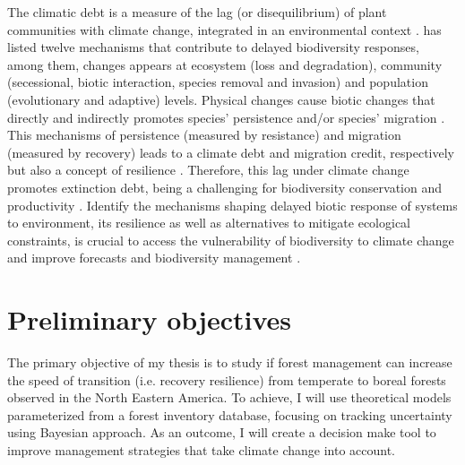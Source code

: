 The climatic debt is a measure of the lag (or disequilibrium) of plant communities with climate change, integrated in an environmental context \parencite{Bertrand2016}.
\textcite{Essl2015} has listed twelve mechanisms that contribute to delayed biodiversity responses, among them, changes appears at ecosystem (loss and degradation), community (secessional, biotic interaction, species removal and invasion) and population (evolutionary and adaptive) levels.
Physical changes cause biotic changes that directly and indirectly promotes species' persistence and/or species' migration \parencite{Bertrand2016}.
This mechanisms of persistence (measured by resistance) and migration (measured by recovery) leads to a climate debt and migration credit, respectively \parencite{Bertrand2016} but also a concept of resilience\footnotemark{} \parencite{Oliver2015}.
Therefore, this lag under climate change promotes extinction debt, being a challenging for biodiversity conservation \parencite{Kuussaari2009} and productivity \parencite{Lasch2002}.
Identify the mechanisms shaping delayed biotic response of systems to environment, its resilience as well as alternatives to mitigate ecological constraints, is crucial to access the vulnerability of biodiversity to climate change and improve forecasts and biodiversity management \parencite{Essl2015,Oliver2015,Bertrand2016}.


\section{Preliminary objectives}

The primary objective of my thesis is to study if forest management can increase the speed of transition (i.e. recovery resilience) from temperate to boreal forests observed in the North Eastern America.
To achieve, I will use theoretical models parameterized from a forest inventory database, focusing on tracking uncertainty using Bayesian approach.
As an outcome, I will create a decision make tool to improve management strategies that take climate change into account.

